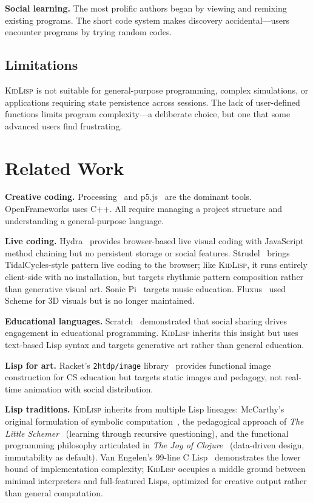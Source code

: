 \documentclass[10pt,letterpaper,twocolumn]{article}
\newcommand{\kidlisp}{\textsc{KidLisp}}
\begin{document}
\textbf{Social learning.} The most prolific authors began by viewing and remixing existing programs. The short code system makes discovery accidental---users encounter programs by trying random codes.

\subsection{Limitations}

\kidlisp{} is not suitable for general-purpose programming, complex simulations, or applications requiring state persistence across sessions. The lack of user-defined functions limits program complexity---a deliberate choice, but one that some advanced users find frustrating.


\section{Related Work}

\textbf{Creative coding.} Processing~\citep{reas2007processing} and p5.js~\citep{mccarthy2015p5js} are the dominant tools. OpenFrameworks uses C++. All require managing a project structure and understanding a general-purpose language.

\textbf{Live coding.} Hydra~\citep{hydra2019} provides browser-based live visual coding with JavaScript method chaining but no persistent storage or social features. Strudel~\citep{roos2023strudel} brings TidalCycles-style pattern live coding to the browser; like \kidlisp{}, it runs entirely client-side with no installation, but targets rhythmic pattern composition rather than generative visual art. Sonic Pi~\citep{aaron2016sonic} targets music education. Fluxus~\citep{fluxus2007} used Scheme for 3D visuals but is no longer maintained.

\textbf{Educational languages.} Scratch~\citep{resnick2009scratch} demonstrated that social sharing drives engagement in educational programming. \kidlisp{} inherits this insight but uses text-based Lisp syntax and targets generative art rather than general education.

\textbf{Lisp for art.} Racket's \texttt{2htdp/image} library~\citep{racket2018} provides functional image construction for CS education but targets static images and pedagogy, not real-time animation with social distribution.

\textbf{Lisp traditions.} \kidlisp{} inherits from multiple Lisp lineages: McCarthy's original formulation of symbolic computation~\citep{mccarthy1960recursive}, the pedagogical approach of \emph{The Little Schemer}~\citep{friedman1996little} (learning through recursive questioning), and the functional programming philosophy articulated in \emph{The Joy of Clojure}~\citep{fogus2011clojure} (data-driven design, immutability as default). Van Engelen's 99-line C Lisp~\citep{vanengelen2022tinylisp} demonstrates the lower bound of implementation complexity; \kidlisp{} occupies a middle ground between minimal interpreters and full-featured Lisps, optimized for creative output rather than general computation.
\end{document}
